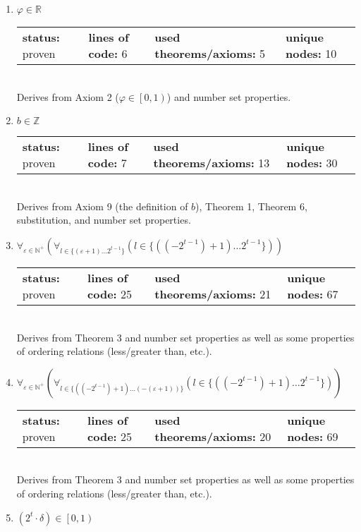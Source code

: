 \documentclass{article}[12pt]
\begin{document}
\begin{enumerate}
\item $\varphi \in \mathbb{R}$ \hfill \\
  \begin{tabular}{l | l | l | l}
    \textbf{status:} proven & \textbf{lines of code:} 6 & \textbf{used theorems/axioms:} 5 & \textbf{unique nodes:} 10
  \end{tabular} \hfill \\
  Derives from Axiom 2 ($\varphi \in \left[0,1\right)$) and number set properties.
\item $b \in \mathbb{Z}$ \hfill \\
  \begin{tabular}{l | l | l | l}
    \textbf{status:} proven & \textbf{lines of code:} 7 & \textbf{used theorems/axioms:} 13 & \textbf{unique nodes:} 30
  \end{tabular} \hfill \\
  Derives from Axiom 9 (the definition of $b$), Theorem 1, Theorem 6, substitution, and number set properties.
\item $\forall_{\varepsilon \in \mathbb{N}^+} \left(\forall_{l \in \{\left(\varepsilon + 1\right)\ldots 2^{t - 1}\}} \left(l \in \{\left(\left(-2^{t - 1}\right) + 1\right)\ldots 2^{t - 1}\}\right)\right)$ \hfill \\
  \begin{tabular}{l | l | l | l}
    \textbf{status:} proven & \textbf{lines of code:} 25 & \textbf{used theorems/axioms:} 21 & \textbf{unique nodes:} 67
  \end{tabular} \hfill \\
Derives from Theorem 3 and number set properties as well as some properties of ordering relations (less/greater than, etc.).
\item $\forall_{\varepsilon \in \mathbb{N}^+} \left(\forall_{l \in \{\left(\left(-2^{t - 1}\right) + 1\right)\ldots \left(-\left(\varepsilon + 1\right)\right)\}} \left(l \in \{\left(\left(-2^{t - 1}\right) + 1\right)\ldots 2^{t - 1}\}\right)\right)$ \hfill \\
  \begin{tabular}{l | l | l | l}
    \textbf{status:} proven & \textbf{lines of code:} 25 & \textbf{used theorems/axioms:} 20 & \textbf{unique nodes:} 69
  \end{tabular} \hfill \\
Derives from Theorem 3 and number set properties as well as some properties of ordering relations (less/greater than, etc.).
\item $\left(2^{t} \cdot \delta\right) \in \left[0,1\right)$ \hfill \\

\end{enumerate}
\end{document}
